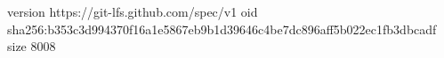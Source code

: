 version https://git-lfs.github.com/spec/v1
oid sha256:b353c3d994370f16a1e5867eb9b1d39646c4be7dc896aff5b022ec1fb3dbcadf
size 8008
